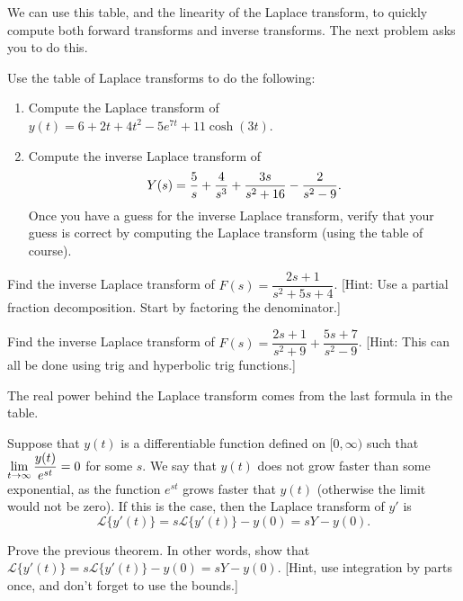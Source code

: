 We can use this table, and the linearity of the Laplace transform, to quickly compute both forward transforms and inverse transforms.  The next problem asks you to do this.
\begin{problem}
 Use the table of Laplace transforms to do the following:
\begin{enumerate}
 \item Compute the Laplace transform of $y(t) = 6+2t+4t^2-5e^{7t}+11\cosh(3t)$. 
 \item Compute the inverse Laplace transform of $$\displaystyle Y(s) = \frac{5}{s}+\frac{4}{s^3}+\frac{3s}{s^2+16}-\frac{2}{s^2-9}.$$ Once you have a guess for the inverse Laplace transform, verify that your guess is correct by computing the Laplace transform (using the table of course).
\end{enumerate}
\end{problem}

\begin{problem}
Find the inverse Laplace transform of $F(s) = \dfrac{2s+1}{s^2+5s+4}$.  [Hint: Use a partial fraction decomposition. Start by factoring the denominator.]
\end{problem}

\begin{problem}
Find the inverse Laplace transform of $F(s) = \dfrac{2s+1}{s^2+9} + \dfrac{5s+7}{s^2-9}$.  [Hint: This can all be done using trig and hyperbolic trig functions.]
\end{problem}



The real power behind the Laplace transform comes from the last formula in the table. 
\begin{theorem} \label{laplace transform of a derivative}
 Suppose that $y(t)$ is a differentiable function defined on $[0,\infty)$ such that $\displaystyle\lim_{t\to \infty}\frac{y(t)}{e^{st}}=0$ for some $s$. We say that $y(t)$ does not grow faster than some exponential, as the function $e^{st}$ grows faster that $y(t)$ (otherwise the limit would not be zero).  If this is the case, then the Laplace transform of $y'$ is
 $$\mathscr{L}\{y'(t)\} = s \mathscr{L}\{y'(t)\} - y(0) = sY - y(0).$$
\end{theorem}

\begin{problem}
 Prove the previous theorem.  In other words, show that $\mathscr{L}\{y'(t)\} = s \mathscr{L}\{y'(t)\} - y(0) = sY - y(0).$  [Hint, use integration by parts once, and don't forget to use the bounds.]
\end{problem}

